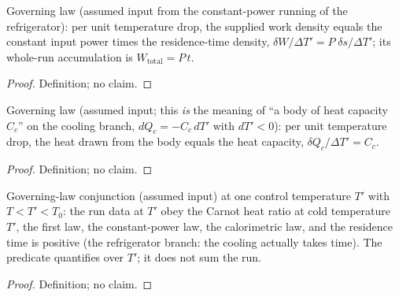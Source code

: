 \begin{definition}
\label{def:IPhO2026Problems_problem_IPhO_2026_3_C_4:ConstantPowerDensityLaw}
Governing law (assumed input from the constant-power running of the
refrigerator): per unit temperature drop, the supplied work density
equals the constant input power times the residence-time density,
$\delta W/\Delta T' = P\;\delta s/\Delta T'$; its whole-run
accumulation is $W_{\mathrm{total}} = P\,t$.
\end{definition}
\begin{proof}
Definition; no claim.
\end{proof}

\begin{definition}
\label{def:IPhO2026Problems_problem_IPhO_2026_3_C_4:BodyCalorimeterDensityLaw}
Governing law (assumed input; this \emph{is} the meaning of ``a body
of heat capacity $C_c$'' on the cooling branch, $dQ_c = -C_c\,dT'$
with $dT' < 0$): per unit temperature drop, the heat drawn from the
body equals the heat capacity, $\delta Q_c/\Delta T' = C_c$.
\end{definition}
\begin{proof}
Definition; no claim.
\end{proof}

\begin{definition}
\label{def:IPhO2026Problems_problem_IPhO_2026_3_C_4:InfinitesimalCycleLaw}
Governing-law conjunction (assumed input) at one control temperature
$T'$ with $T < T' < T_0$: the run data at $T'$ obey the Carnot heat
ratio at cold temperature $T'$, the first law, the constant-power
law, the calorimetric law, and the residence time is positive (the
refrigerator branch: the cooling actually takes time). The predicate
quantifies over $T'$; it does not sum the run.
\end{definition}
\begin{proof}
Definition; no claim.
\end{proof}

